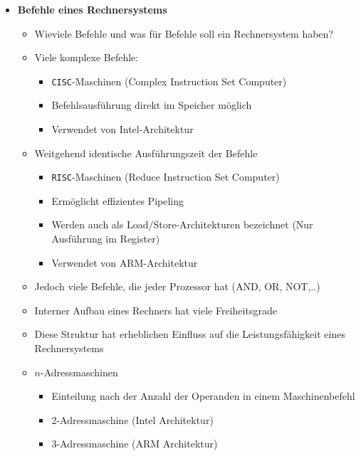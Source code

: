 \begin{itemize}
        \item \textbf{Befehle eines Rechnersystems}
            \begin{itemize}
                \item Wieviele Befehle und was für Befehle soll ein Rechnersystem haben?
                \item Viele komplexe Befehle: 
                    \begin{itemize}
                        \item \texttt{CISC}-Maschinen (Complex Instruction Set Computer)
                        \item Befehlsausführung direkt im Speicher möglich
                        \item Verwendet von Intel-Architektur 
                    \end{itemize}
                \item Weitgehend identische Ausführungszeit der Befehle
                    \begin{itemize}
                        \item \texttt{RISC}-Maschinen (Reduce Instruction Set Computer)
                        \item Ermöglicht effizientes Pipeling
                        \item Werden auch als Load/Store-Architekturen bezeichnet (Nur Ausführung im Register)
                        \item Verwendet von ARM-Architektur
                    \end{itemize}
                \item Jedoch viele Befehle, die jeder Prozessor hat (AND, OR, NOT,..)
                \item Interner Aufbau eines Rechners hat viele Freiheitsgrade
                \item Diese Struktur hat erheblichen Einfluss auf die Leistungsfähigkeit eines Rechnersystems 
                \item $n$-Adressmaschinen
                    \begin{itemize}
                        \item Einteilung nach der Anzahl der Operanden in einem Maschinenbefehl 
                        \item 2-Adressmaschine (Intel Architektur)
                        \item 3-Adressmaschine (ARM Architektur)
                    \end{itemize}
            \end{itemize}


\end{itemize}
